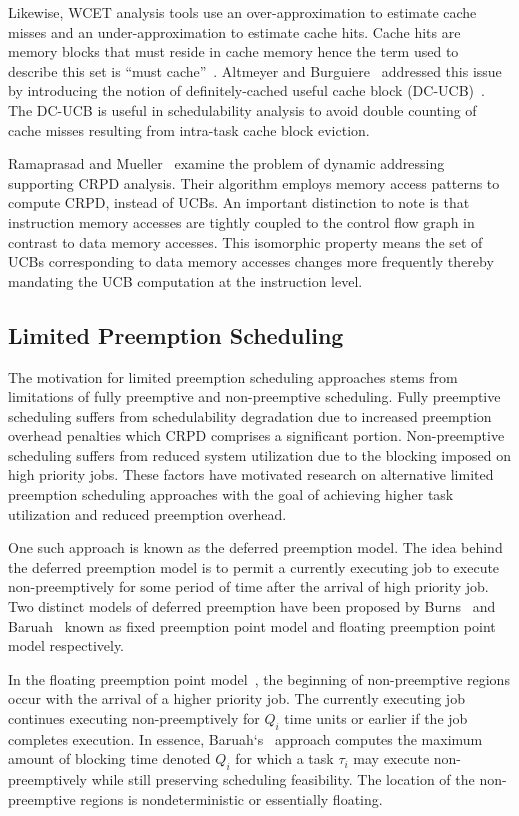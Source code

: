 Likewise, WCET analysis tools use an over-approximation to estimate cache misses and an under-approximation to estimate cache hits.  Cache hits are memory blocks that must reside in cache memory hence the term used to describe this set is “must cache”~\cite{altmeyer:11c}.  Altmeyer and Burguiere~\cite{altmeyer:11c} addressed this issue by introducing the notion of definitely-cached useful cache block (DC-UCB)~\cite{altmeyer:11c}.  The DC-UCB is useful in schedulability analysis to avoid double counting of cache misses resulting from intra-task cache block eviction.

Ramaprasad and Mueller~\cite{ramaprasad:06} examine the problem of dynamic addressing supporting CRPD analysis. Their algorithm employs memory access patterns to compute CRPD, instead of UCBs.  An important distinction to note is that instruction memory accesses are tightly coupled to the control flow graph in contrast to data memory accesses. This isomorphic property means the set of UCBs corresponding to data memory accesses changes more frequently thereby mandating the UCB computation at the instruction level.
\subsection {Limited Preemption Scheduling}\label{sec:lp_related_work}
The motivation for limited preemption scheduling approaches stems from limitations of fully preemptive and non-preemptive scheduling.  Fully preemptive scheduling suffers from schedulability degradation due to increased preemption overhead penalties which CRPD comprises a significant portion.  Non-preemptive scheduling suffers from reduced system utilization due to the blocking imposed on high priority jobs.  These factors have motivated research on alternative limited preemption scheduling approaches with the goal of achieving higher task utilization and reduced preemption overhead.

One such approach is known as the deferred preemption model.  The idea behind the deferred preemption model is to permit a currently executing job to execute non-preemptively for some period of time after the arrival of high priority job.  Two distinct models of deferred preemption have been proposed by Burns~\cite{burns:05} and Baruah~\cite{baruah:05} known as fixed preemption point model and floating preemption point model respectively.

In the floating preemption point model~\cite{baruah:05}, the beginning of non-preemptive regions occur with the arrival of a higher priority job.  The currently executing job continues executing non-preemptively for \begin{math}Q_{i}\end{math} time units or earlier if the job completes execution. In essence, Baruah`s~\cite{baruah:05} approach computes the maximum amount of blocking time denoted \begin{math}Q_{i}\end{math} for which a task \begin{math}\tau_{i}\end{math} may execute non-preemptively while still preserving scheduling feasibility. The location of the non-preemptive regions is nondeterministic or essentially floating.

